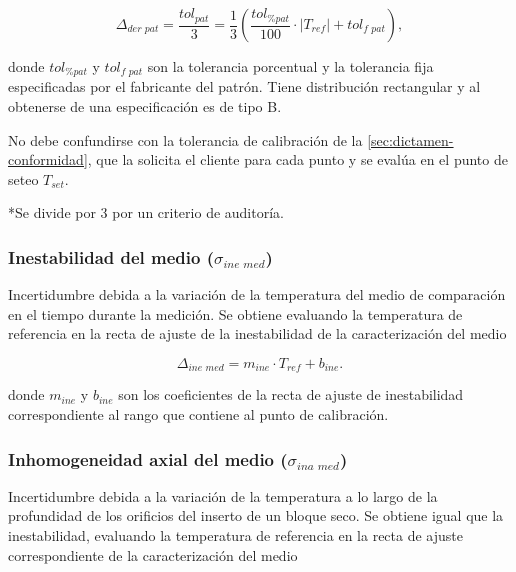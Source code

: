 \begin{equation}
    \Delta_{\textit{der pat}} = \frac{tol_{\textit{pat}}}{3} = \frac{1}{3}\left( \frac{tol_{\textit{\% pat}}}{100}\cdot\lvert T_{ref} \rvert + tol_{\textit{f pat}} \right),
\end{equation}

donde $tol_{\textit{\% pat}}$ y $tol_{\textit{f pat}}$ son la tolerancia porcentual y la tolerancia fija especificadas por el fabricante del patrón. Tiene distribución rectangular y al obtenerse de una especificación es de tipo B.

No debe confundirse con la tolerancia de calibración de la \cref{sec:dictamen-conformidad}, que la solicita el cliente para cada punto y se evalúa en el punto de seteo $T_{set}$.

*Se divide por 3 por un criterio de auditoría.


\subsubsection{Inestabilidad del medio ($\sigma_{\textit{ine med}}$)}

Incertidumbre debida a la variación de la temperatura del medio de comparación en el tiempo durante la medición. Se obtiene evaluando la temperatura de referencia en la recta de ajuste de la inestabilidad de la caracterización del medio

\begin{equation}
    \Delta_{\textit{ine med}} = m_{ine}\cdot T_{ref} + b_{ine}.
\end{equation}

donde $m_{ine}$ y $b_{ine}$ son los coeficientes de la recta de ajuste de inestabilidad correspondiente al rango que contiene al punto de calibración.

\subsubsection{Inhomogeneidad axial del medio ($\sigma_{\textit{ina med}}$)}

Incertidumbre debida a la variación de la temperatura a lo largo de la profundidad de los orificios del inserto de un bloque seco. Se obtiene igual que la inestabilidad, evaluando la temperatura de referencia en la recta de ajuste correspondiente de la caracterización del medio

